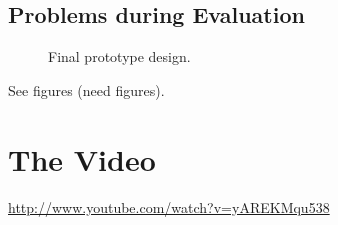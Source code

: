 \documentclass{article}
\begin{document}
\subsection{Problems during Evaluation}

\begin{figure}
\centering
\vspace{-50mm}
\caption{Final prototype design.}
\label{fig:ffp}
\end{figure}


See figures (need figures).
\section{The Video}

\url{http://www.youtube.com/watch?v=yAREKMqu538}

\end{document}
